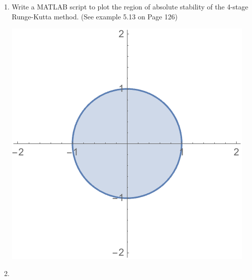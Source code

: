 \documentclass[11pt, oneside, titlepage]{article}
\begin{document}
\begin{enumerate}
    \item %
        Write a MATLAB script to plot the region of absolute stability of the
        4-stage Runge-Kutta method. (See example 5.13 on Page 126)

        \begin{center}
            \includegraphics[scale=.5]{Figures/05_3.png}
        \end{center}

    \item %

\end{enumerate}
\end{document}
